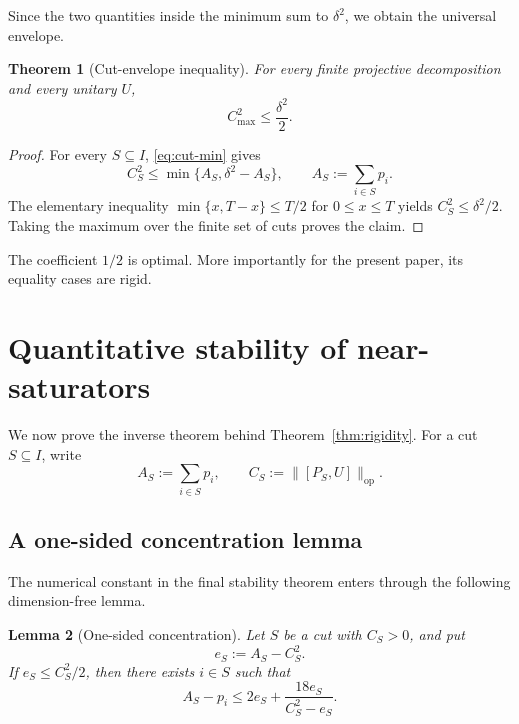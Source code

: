 \documentclass[11pt]{article}
\newtheorem{theorem}{Theorem}[section]
\newtheorem{lemma}[theorem]{Lemma}
\newcommand{\op}{\mathrm{op}}
\newcommand{\cmax}{C_{\max}}
\newcommand{\dd}{\delta}
\begin{document}
Since the two quantities inside the minimum sum to $\dd^2$, we obtain the
universal envelope.

\begin{theorem}[Cut-envelope inequality]\label{thm:envelope}
For every finite projective decomposition and every unitary $U$,
\[
  \boxed{\cmax^2\le\frac{\dd^2}{2}}.
\]
\end{theorem}

\begin{proof}
For every $S\subseteq I$, \eqref{eq:cut-min} gives
\[
  C_S^2
  \le
  \min\{A_S,\dd^2-A_S\},
  \qquad
  A_S:=\sum_{i\in S}p_i.
\]
The elementary inequality
$\min\{x,T-x\}\le T/2$ for $0\le x\le T$ yields
$C_S^2\le\dd^2/2$.  Taking the maximum over the finite set of cuts proves the
claim.
\end{proof}

The coefficient $1/2$ is optimal.  More importantly for the present paper,
its equality cases are rigid.

\section{Quantitative stability of near-saturators}

We now prove the inverse theorem behind Theorem~\ref{thm:rigidity}.  For a
cut $S\subseteq I$, write
\[
  A_S:=\sum_{i\in S}p_i,
  \qquad
  C_S:=\|[P_S,U]\|_{\op}.
\]

\subsection{A one-sided concentration lemma}

The numerical constant in the final stability theorem enters through the
following dimension-free lemma.

\begin{lemma}[One-sided concentration]\label{lem:onesided}
Let $S$ be a cut with $C_S>0$, and put
\[
  e_S:=A_S-C_S^2.
\]
If $e_S\le C_S^2/2$, then there exists $i\in S$ such that
\begin{equation}\label{eq:onesided}
  A_S-p_i
  \le
  2e_S+\frac{18e_S}{C_S^2-e_S}.
\end{equation}
\end{lemma}
\end{document}
